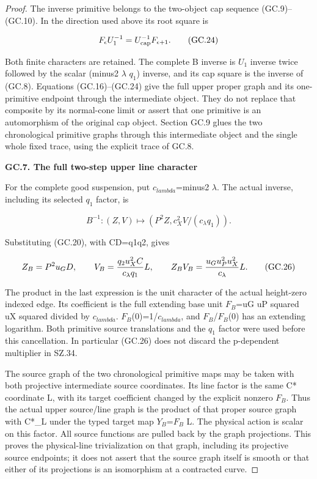 \begin{proof}
The inverse primitive belongs to the two-object cap sequence
(GC.9)--(GC.10). In the direction used above its root square is

\[
                    F_\epsilon U_1^{-1}
                         =U_{\rm cap}^{-1}F_{\epsilon+1}.
 \tag{GC.24}
\]

Both finite characters are retained. The complete B inverse is
\(U_1\) inverse twice followed by the scalar (minus2 \(\lambda\) \(q_1\))
inverse, and its cap square is the inverse of (GC.8).
Equations (GC.16)--(GC.24) give the full upper proper graph and
its one-primitive endpoint through the intermediate object.
They do not replace that composite by its normal-cone limit or
assert that one primitive is an automorphism of the original
cap object. Section GC.9 glues the two chronological primitive
graphs through this intermediate object and the single whole
fixed trace, using the explicit trace of GC.8.

\par

\medskip\noindent\textbf{GC.7. The full two-step upper line character}

\par\nobreak

For the complete good suspension, put \(c_{lambda}\)=minus2 \(\lambda\).
The actual inverse, including its selected \(q_1\) factor, is

\[
 B^{-1}:(Z,V)\longmapsto
       (P^2Z,c_X^2V/(c_\lambda q_1)).
 \tag{GC.25}
\]

Substituting (GC.20), with CD=q1q2, gives

\[
 Z_B=P^2u_GD,\qquad
 V_B={q_2u_X^2C\over c_\lambda q_1}L,\qquad
 Z_BV_B={u_Gu_P^2u_X^2\over c_\lambda}L.
 \tag{GC.26}
\]

The product in the last expression is the unit character of
the actual height-zero indexed edge. Its coefficient is the
full extending base unit \(F_{B}\)=uG uP squared uX squared divided
by \(c_{lambda}\). \(F_{B}\)(0)=1/\(c_{lambda}\), and \(F_{B}\)/\(F_{B}\)(0) has an
extending logarithm. Both primitive source translations and
the \(q_1\) factor were used before this cancellation. In particular
(GC.26) does not discard the p-dependent multiplier in SZ.34.

The source graph of the two chronological primitive maps may
be taken with both projective intermediate source coordinates.
Its line factor is the same C* coordinate L, with its target
coefficient changed by the explicit nonzero \(F_{B}\). Thus the
actual upper source/line graph is the product of that proper
source graph with C*\_L under the typed target map
\(Y_{B}\)=\(F_{B}\) L. The physical action is scalar on this factor.
All source functions are pulled back by the graph projections.
This proves the physical-line trivialization on that graph,
including its projective source endpoints; it does not assert
that the source graph itself is smooth or that either of its
projections is an isomorphism at a contracted curve.


\end{proof}
